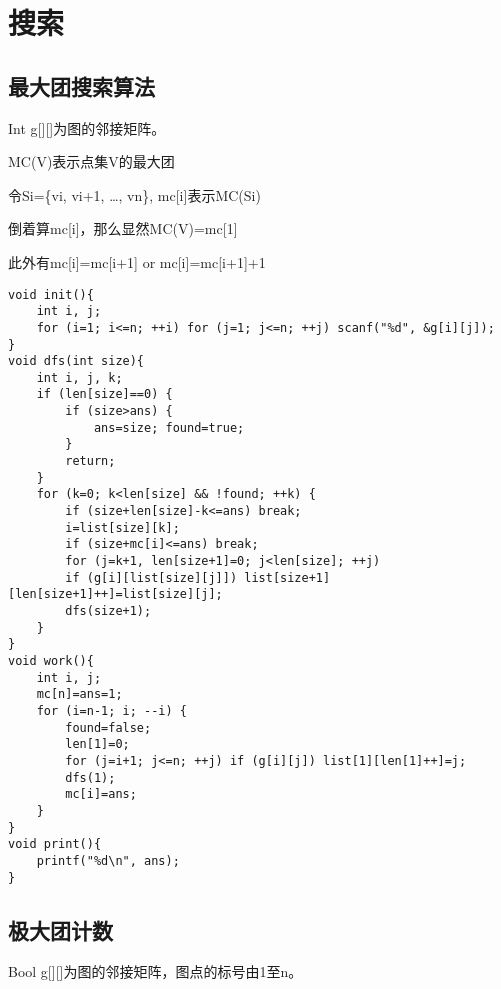 \documentclass{article}
\begin{document}
\section{搜索}

\subsection{最大团搜索算法}

Int g{[}{]}{[}{]}为图的邻接矩阵。

MC(V)表示点集V的最大团

令Si=\{vi, vi+1, \ldots{}, vn\}, mc{[}i{]}表示MC(Si)

倒着算mc{[}i{]}，那么显然MC(V)=mc{[}1{]}

此外有mc{[}i{]}=mc{[}i+1{]} or mc{[}i{]}=mc{[}i+1{]}+1

\begin{lstlisting}
void init(){
    int i, j;
    for (i=1; i<=n; ++i) for (j=1; j<=n; ++j) scanf("%d", &g[i][j]);
}
void dfs(int size){
    int i, j, k;
    if (len[size]==0) {
        if (size>ans) {
            ans=size; found=true;
        }
        return;
    }
    for (k=0; k<len[size] && !found; ++k) {
        if (size+len[size]-k<=ans) break;
        i=list[size][k];
        if (size+mc[i]<=ans) break;
        for (j=k+1, len[size+1]=0; j<len[size]; ++j)
        if (g[i][list[size][j]]) list[size+1][len[size+1]++]=list[size][j];
        dfs(size+1);
    }
}
void work(){
    int i, j;
    mc[n]=ans=1;
    for (i=n-1; i; --i) {
        found=false;
        len[1]=0;
        for (j=i+1; j<=n; ++j) if (g[i][j]) list[1][len[1]++]=j;
        dfs(1);
        mc[i]=ans;
    }
}
void print(){
    printf("%d\n", ans);
}
\end{lstlisting}

\subsection{极大团计数}

Bool g{[}{]}{[}{]}为图的邻接矩阵，图点的标号由1至n。
\end{document}
